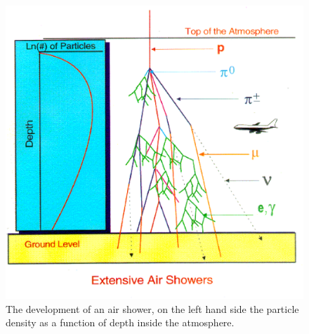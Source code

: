 \documentclass[12pt,a4paper]{article}
\numberwithin{equation}{section}
\numberwithin{figure}{section}
\numberwithin{table}{section}
\begin{document}
\begin{figure}\begin{center}
\includegraphics[scale=0.45]{shower_density.eps}%
\caption{The development of an air shower, on the left hand side the particle density as a function of depth inside the atmosphere.}\label{fig:shower_density}
\end{center}\end{figure}
\end{document}
